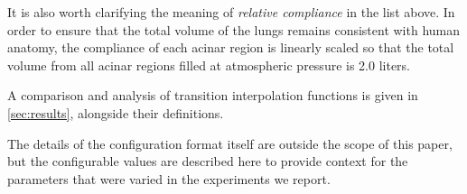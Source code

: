 \breakpars

It is also worth clarifying the meaning of \textit{relative compliance} in the list above. In order
to ensure that the total volume of the lungs remains consistent with human anatomy, the compliance
of each acinar region is linearly scaled so that the total volume from all acinar regions filled at
atmospheric pressure is 2.0 liters.


\breakpars

A comparison and analysis of transition interpolation functions is given in \autoref{sec:results},
alongside their definitions.

\breakpars

The details of the configuration format itself are outside the scope of this paper, but the
configurable values are described here to provide context for the parameters that were varied in the
experiments we report.
